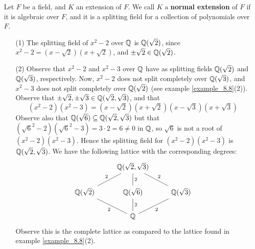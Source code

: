 \begin{definition}
  Let $F$ be a field, and $K$ an extension of $F$. We call $K$ a
  \textbf{normal extension} of $F$ if it is algebraic over $F$, and it
  is a splitting field for a collection of polynomials over $F$.
\end{definition}

\begin{example}\label{example_8.12}
  \begin{enumerate}
    \item[(1)] The splitting field of $x^2-2$ over $\mathbb{Q}$ is
      $\mathbb{Q}(\sqrt{2})$, since $x^2-2=(x-\sqrt{2})(x+\sqrt{2})$, and
      $\pm{\sqrt{2}} \in \mathbb{Q}(\sqrt{2})$.

    \item[(2)] Observe that $x^2-2$ and  $x^2-3$ over $\mathbb{Q}$ have as
      splitting fields $\mathbb{Q}(\sqrt{2})$ and $\mathbb{Q}(\sqrt{3})$,
      respectively. Now, $x^2-2$ does not split completely over
      $\mathbb{Q}(\sqrt{3})$, and $x^2-3$ does not split completely over
      $\mathbb{Q}(\sqrt{2})$ (see example \ref{example_8.8}(2)). Observe that
      $\pm{\sqrt{2}},\pm{\sqrt{3}} \in \mathbb{Q}(\sqrt{2},\sqrt{3})$, and
      that
      \begin{equation*}
        (x^2-2)(x^2-3)=(x-\sqrt{2})(x+\sqrt{2})(x-\sqrt{3})(x+\sqrt{3})
      \end{equation*}
      Observe also that $\mathbb{Q}(\sqrt{6}) \subseteq \mathbb{Q}(\sqrt{2},\sqrt{3})$
      but that $(\sqrt{6}^2-2)(\sqrt{6}^2-3)=3 \cdot 2=6 \neq 0$ in
      $\mathbb{Q}$, so  $\sqrt{6}$ is not a root of $(x^2-2)(x^2-3)$. Hence
      the splitting field for $(x^2-2)(x^2-3)$ is
      $\mathbb{Q}(\sqrt{2},\sqrt{3})$. We have the following lattice with the
      corresponding degrees:
      \[\begin{tikzcd}
  & {\Q(\sqrt{2}, \sqrt{3})} \\
        {\Q(\sqrt{2})} & {\Q(\sqrt{6})} & {\Q(\sqrt{3})} \\
                       & \Q
                       \arrow["2", no head, from=2-1, to=1-2]
                       \arrow["2"', no head, from=2-2, to=1-2]
                       \arrow["2"', no head, from=2-3, to=1-2]
                       \arrow["2", no head, from=3-2, to=2-1]
                       \arrow["2"', no head, from=3-2, to=2-2]
                       \arrow["2"', no head, from=3-2, to=2-3]
      \end{tikzcd}\]
      Observe this is the complete lattice as compared to the lattice
      found in example \ref{example_8.8}(2).


\end{enumerate}
\end{example}
